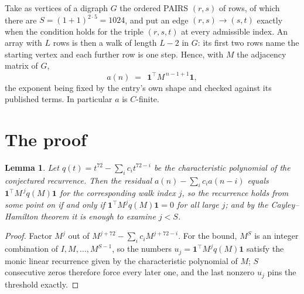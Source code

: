 \documentclass[11pt,a4paper]{article}
\theoremstyle{plain}
\newtheorem{lemma}[theorem]{Lemma}
\theoremstyle{definition}
\begin{document}
Take as vertices of a digraph $G$ the ordered PAIRS $(r,s)$ of rows, of which there are
$S=(1+1)^{2\cdot5}=1024$, and put an edge $(r,s)\to(s,t)$ exactly when the condition
holds for the triple $(r,s,t)$ at every admissible index. An array with $L$ rows is then a
walk of length $L-2$ in $G$: its first two rows name the starting vertex and each further
row is one step. Hence, with $M$ the adjacency matrix of $G$,
\[
a(n)\;=\;\,\mathbf{1}^{\!\top}M^{\,n-1+1}\mathbf{1},
\]
the exponent being fixed by the entry's own shape and checked against its published terms.
In particular $a$ is $C$-finite.

\section{The proof}

\begin{lemma}\label{lem:crit}
Let $q(t)=t^{72}-\sum_i c_it^{72-i}$ be the characteristic polynomial of the
conjectured recurrence. Then the residual $a(n)-\sum_ic_ia(n-i)$ equals
$\mathbf{1}^{\!\top}M^{\,j}q(M)\mathbf{1}$ for the corresponding walk index
$j$, so the recurrence holds from some point on if and only if
$\mathbf{1}^{\!\top}M^{j}q(M)\mathbf{1}=0$ for all large $j$; and by the
Cayley--Hamilton theorem it is enough to examine $j<S$.
\end{lemma}

\begin{proof}
Factor $M^{j}$ out of $M^{j+72}-\sum_ic_iM^{j+72-i}$. For the bound, $M^{S}$
is an integer combination of $I,M,\dots,M^{S-1}$, so the numbers
$u_j=\mathbf{1}^{\!\top}M^{j}q(M)\mathbf{1}$ satisfy the monic linear recurrence given by
the characteristic polynomial of $M$; $S$ consecutive zeros therefore force every later one,
and the last nonzero $u_j$ pins the threshold exactly.
\end{proof}
\end{document}
